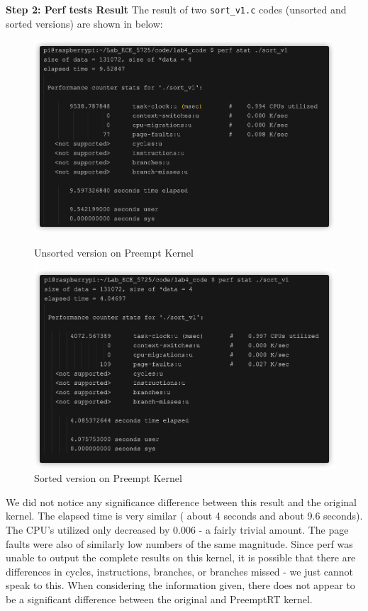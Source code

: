 \documentclass[a4paper,10pt]{article}
\newcommand{\code}[1]{\colorbox{light-gray}{\texttt{#1}}}
\begin{document}
\textbf{Step 2: Perf tests Result}
The result of two \code{sort\_v1.c} codes (unsorted and sorted versions) are shown in below:
\begin{figure}[H]
\centering
\begin{minipage}{0.5\textwidth}
  \centering
  \includegraphics[width=\linewidth]{Images/unsortversion.png}
  \caption{Unsorted version on Preempt Kernel}
\end{minipage}%
\begin{minipage}{0.5\textwidth}
  \centering
  \includegraphics[width=\linewidth]{Images/sortversion.png}
  \caption{Sorted version on Preempt Kernel}
\end{minipage}
\end{figure}
We did not notice any significance difference between this result and the original kernel. The elapsed time is very similar ( about 4 seconds and about 9.6 seconds). The CPU's utilized only decreased by 0.006 - a fairly trivial amount. The page faults were also of similarly low numbers of the same magnitude. Since perf was unable to output the complete results on this kernel, it is possible that there are differences in cycles, instructions, branches, or branches missed - we just cannot speak to this. When considering the information given, there does not appear to be a significant difference between the original and PreemptRT kernel.
\end{document}
